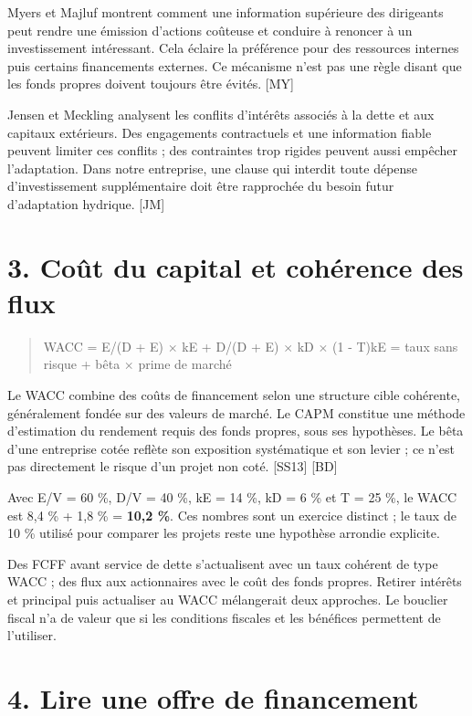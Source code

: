 \documentclass[12pt,a4paper]{article}
\begin{document}
Myers et Majluf montrent comment une information supérieure des dirigeants peut rendre une émission d’actions coûteuse et conduire à renoncer à un investissement intéressant. Cela éclaire la préférence pour des ressources internes puis certains financements externes. Ce mécanisme n’est pas une règle disant que les fonds propres doivent toujours être évités. [MY]


Jensen et Meckling analysent les conflits d’intérêts associés à la dette et aux capitaux extérieurs. Des engagements contractuels et une information fiable peuvent limiter ces conflits ; des contraintes trop rigides peuvent aussi empêcher l’adaptation. Dans notre entreprise, une clause qui interdit toute dépense d’investissement supplémentaire doit être rapprochée du besoin futur d’adaptation hydrique. [JM]

\section*{3. Coût du capital et cohérence des flux}

\begin{quote}\small WACC = E/(D + E) $\times$ kE + D/(D + E) $\times$ kD $\times$ (1 - T)\newline kE = taux sans risque + bêta $\times$ prime de marché\end{quote}

Le WACC combine des coûts de financement selon une structure cible cohérente, généralement fondée sur des valeurs de marché. Le CAPM constitue une méthode d’estimation du rendement requis des fonds propres, sous ses hypothèses. Le bêta d’une entreprise cotée reflète son exposition systématique et son levier ; ce n’est pas directement le risque d’un projet non coté. [SS13] [BD]


Avec E/V = 60 \%, D/V = 40 \%, kE = 14 \%, kD = 6 \% et T = 25 \%, le WACC est 8,4 \% + 1,8 \% = \textbf{10,2 \%}. Ces nombres sont un exercice distinct ; le taux de 10 \% utilisé pour comparer les projets reste une hypothèse arrondie explicite.


Des FCFF avant service de dette s’actualisent avec un taux cohérent de type WACC ; des flux aux actionnaires avec le coût des fonds propres. Retirer intérêts et principal puis actualiser au WACC mélangerait deux approches. Le bouclier fiscal n’a de valeur que si les conditions fiscales et les bénéfices permettent de l’utiliser.

\section*{4. Lire une offre de financement}
\end{document}
